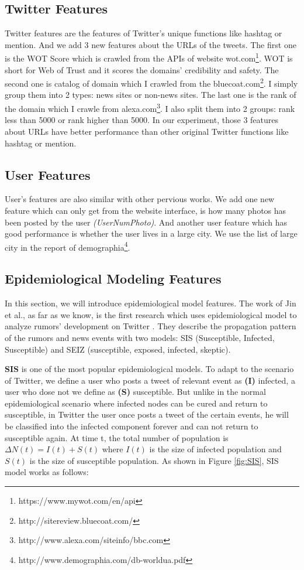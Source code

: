 \subsection{Twitter Features}
Twitter features are the features of Twitter's unique functions like hashtag or mention.
And we add 3 new features about the URLs of the tweets. The first one is the WOT Score which is crawled from the APIs of website wot.com\footnote{https://www.mywot.com/en/api}. WOT is short for Web of Trust and it scores the domains' credibility and safety. The second one is catalog of domain which I crawled from the bluecoat.com\footnote{http://sitereview.bluecoat.com/}. I simply group them into 2 types: news sites or non-news sites. The last one is the rank of the domain which I crawle from alexa.com\footnote{http://www.alexa.com/siteinfo/bbc.com}. I also split them into 2 groups: rank less than 5000 or rank higher than 5000. In our experiment, those 3 features about URLs have better performance than other original Twitter functions like hashtag or mention.
\subsection{User Features}
User's features are also similar with other pervious works. We add one new feature which can only get from the website interface, is how many photos has been posted by the user \emph{(UserNumPhoto)}. And another user feature which has good performance is whether the user lives in a large city. We use the list of large city in the report of demographia\footnote{http://www.demographia.com/db-worldua.pdf}.  
\subsection{Epidemiological Modeling Features}
\label{sec:epide}
In this section, we will introduce epidemiological model features. The work of Jin et al., as far as we know, is the first research which uses epidemiological model to analyze rumors' development on Twitter \cite{jin2013epidemiological}. They describe the propagation pattern of the rumors and news events with two models: SIS (Susceptible, Infected, Susceptible) and SEIZ (susceptible, exposed, infected, skeptic). 

\textbf{SIS} is one of the most popular epidemiological models. To adapt to the scenario of Twitter, we define a user who posts a tweet of relevant event as \textbf{(I)} infected, a user who dose not we define as \textbf{(S)} susceptible. But unlike in the normal epidemiological scenario where  infected nodes can be cured and return to susceptible, in Twitter the user once posts a tweet of the certain events, he will be classified into the infected component forever and can not return to susceptible again. At time t, the total number of population is $\Delta N(t)= I(t) + S(t)$ where $I(t)$ is the size of infected population and $S(t)$ is the size of susceptible population. As shown in Figure \ref{fig:SIS}, SIS model works as follows:

